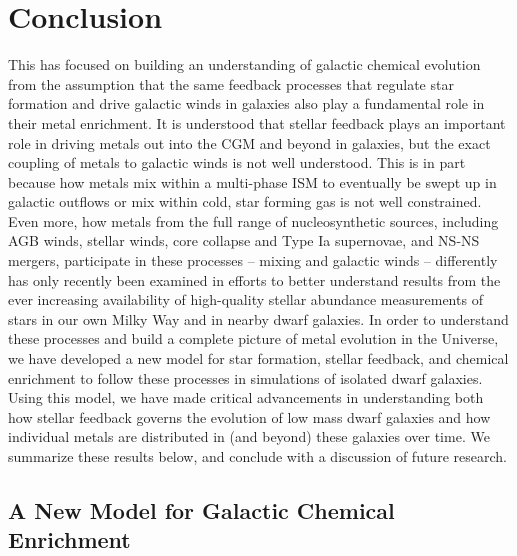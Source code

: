 \chapter[Conclusion]{Conclusion}
\label{ch:conclusion}


This \dissertation has focused on building an understanding of galactic chemical evolution from the assumption that the same feedback processes that regulate star formation and drive galactic winds in galaxies also play a fundamental role in their metal enrichment. It is understood that stellar feedback plays an important role in driving metals out into the CGM and beyond in galaxies, but the exact coupling of metals to galactic winds is not well understood. This is in part because how metals mix within a multi-phase ISM to eventually be swept up in galactic outflows or mix within cold, star forming gas is not well constrained. Even more, how metals from the full range of nucleosynthetic sources, including AGB winds, stellar winds, core collapse and Type Ia supernovae, and NS-NS mergers, participate in these processes -- mixing and galactic winds -- differently has only recently been examined in efforts to better understand results from the ever increasing availability of high-quality stellar abundance measurements of stars in our own Milky Way and in nearby dwarf galaxies. In order to understand these processes and build a complete picture of metal evolution in the Universe, we have developed a new model for star formation, stellar feedback, and chemical enrichment to follow these processes in simulations of isolated dwarf galaxies. Using this model, we have made critical advancements in understanding both how stellar feedback governs the evolution of low mass dwarf galaxies and how individual metals are distributed in (and beyond) these galaxies over time. We summarize these results below, and conclude with a discussion of future research.


\section{A New Model for Galactic Chemical Enrichment}

